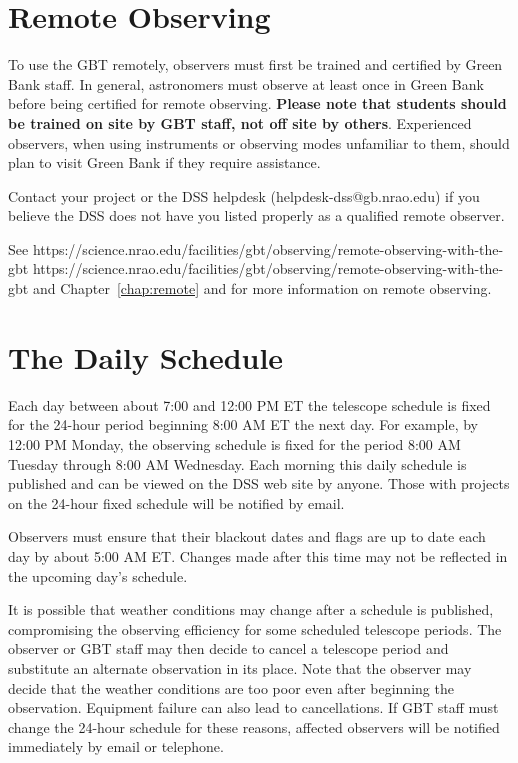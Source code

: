 \section{Remote Observing }

To use the \gls{GBT} remotely, observers must first be trained and certified by Green
Bank staff. In general, astronomers must observe at least once in Green Bank before
being certified for remote observing. {\bf Please note that students should be trained
on site by \gls{GBT} staff, not off site by others}. Experienced observers, when using instruments
or observing modes unfamiliar to them, should plan to visit Green Bank if they require
assistance. 

Contact your project  or the \gls{DSS} helpdesk (helpdesk-dss@gb.nrao.edu) if
you believe the \gls{DSS} does not have you listed properly as a qualified remote observer.

See \htmladdnormallink
{https://science.nrao.edu/facilities/gbt/observing/remote-observing-with-the-gbt}
{https://science.nrao.edu/facilities/gbt/observing/remote-observing-with-the-gbt} and
Chapter~\ref{chap:remote} and for more information on remote observing.


\section{The Daily Schedule}

Each day between about 7:00 and 12:00 PM ET the telescope schedule is fixed for the
24-hour period beginning 8:00 AM ET the next day. For example, by 12:00 PM
Monday, the observing schedule is fixed for the period 8:00 AM Tuesday through 8:00
AM Wednesday. Each morning this daily schedule is published and can be viewed on
the \gls{DSS} web site by anyone. Those with projects on the 24-hour fixed schedule will be
notified by email.

Observers must ensure that their blackout dates and  flags are up to date
each day by about 5:00 AM ET. Changes made after this time may not be reflected in the
upcoming day's schedule.

It is possible that weather conditions may change after a schedule is published,
compromising the observing efficiency for some scheduled telescope periods. The
observer or \gls{GBT} staff may then decide to cancel a telescope period and substitute an
alternate  observation in its place. Note that the observer may decide that the
weather conditions are too poor even after beginning the observation. Equipment failure
can also lead to cancellations. If \gls{GBT} staff must change the 24-hour schedule for these
reasons, affected observers will be notified immediately by email or telephone.


